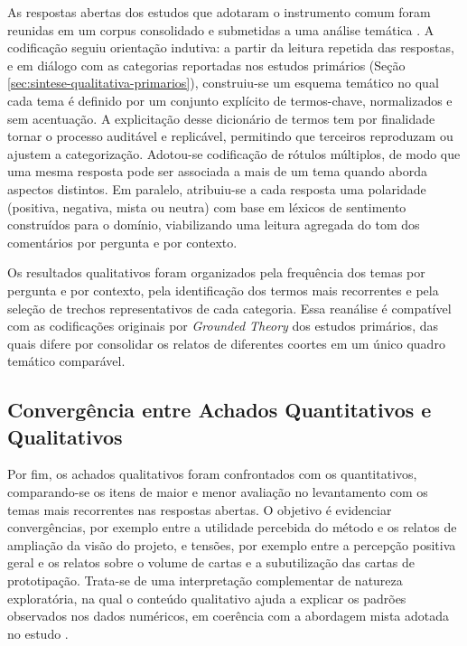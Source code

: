 As respostas abertas dos estudos que adotaram o instrumento comum foram reunidas em um corpus consolidado e submetidas a uma análise temática \cite{braunclarke2006,saldana2013}. A codificação seguiu orientação indutiva: a partir da leitura repetida das respostas, e em diálogo com as categorias reportadas nos estudos primários (Seção \ref{sec:sintese-qualitativa-primarios}), construiu-se um esquema temático no qual cada tema é definido por um conjunto explícito de termos-chave, normalizados e sem acentuação. A explicitação desse dicionário de termos tem por finalidade tornar o processo auditável e replicável, permitindo que terceiros reproduzam ou ajustem a categorização. Adotou-se codificação de rótulos múltiplos, de modo que uma mesma resposta pode ser associada a mais de um tema quando aborda aspectos distintos. Em paralelo, atribuiu-se a cada resposta uma polaridade (positiva, negativa, mista ou neutra) com base em léxicos de sentimento construídos para o domínio, viabilizando uma leitura agregada do tom dos comentários por pergunta e por contexto.

Os resultados qualitativos foram organizados pela frequência dos temas por pergunta e por contexto, pela identificação dos termos mais recorrentes e pela seleção de trechos representativos de cada categoria. Essa reanálise é compatível com as codificações originais por \textit{Grounded Theory} dos estudos primários, das quais difere por consolidar os relatos de diferentes coortes em um único quadro temático comparável.

\subsection{Convergência entre Achados Quantitativos e Qualitativos}
\label{sec:convergencia}

Por fim, os achados qualitativos foram confrontados com os quantitativos, comparando-se os itens de maior e menor avaliação no levantamento com os temas mais recorrentes nas respostas abertas. O objetivo é evidenciar convergências, por exemplo entre a utilidade percebida do método e os relatos de ampliação da visão do projeto, e tensões, por exemplo entre a percepção positiva geral e os relatos sobre o volume de cartas e a subutilização das cartas de prototipação. Trata-se de uma interpretação complementar de natureza exploratória, na qual o conteúdo qualitativo ajuda a explicar os padrões observados nos dados numéricos, em coerência com a abordagem mista adotada no estudo \cite{runeson2012}.

